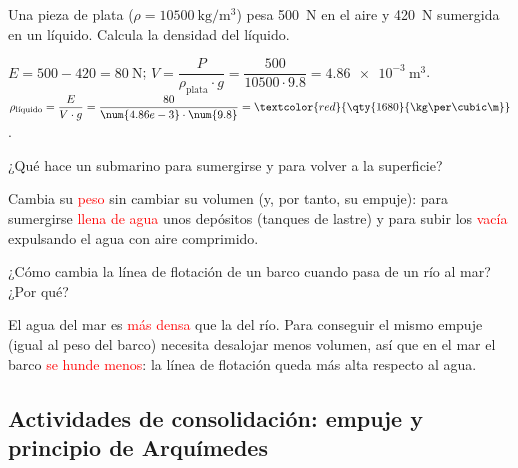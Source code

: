 \begin{exercise}
    Una pieza de plata (\(\rho = \qty{10500}{\kg\per\cubic\m}\)) pesa \qty{500}{\newton} en el aire y \qty{420}{\newton} sumergida en un líquido. Calcula la densidad del líquido.
    \begin{solu}
        \(E = 500 - 420 = \qty{80}{\newton}\); \(V = \dfrac{P}{\rho_{\text{plata}} \cdot g} = \dfrac{500}{10500 \cdot \num{9.8}} = \qty{4.86e-3}{\cubic\m}\).
        \(\rho_{\text{líquido}} = \dfrac{E}{V \cdot g} = \dfrac{80}{\num{4.86e-3} \cdot \num{9.8}} = \textcolor{red}{\qty{1680}{\kg\per\cubic\m}}\).
    \end{solu}
\end{exercise}

\begin{exercise}
    ¿Qué hace un submarino para sumergirse y para volver a la superficie?
    \begin{solu}
        Cambia su \textcolor{red}{peso} sin cambiar su volumen (y, por tanto, su empuje): para sumergirse \textcolor{red}{llena de agua} unos depósitos (tanques de lastre) y para subir los \textcolor{red}{vacía} expulsando el agua con aire comprimido.
    \end{solu}
\end{exercise}

\begin{exercise}
    ¿Cómo cambia la línea de flotación de un barco cuando pasa de un río al mar? ¿Por qué?
    \begin{solu}
        El agua del mar es \textcolor{red}{más densa} que la del río. Para conseguir el mismo empuje (igual al peso del barco) necesita desalojar menos volumen, así que en el mar el barco \textcolor{red}{se hunde menos}: la línea de flotación queda más alta respecto al agua.
    \end{solu}
\end{exercise}

\subsection*{Actividades de consolidación: empuje y principio de Arquímedes}

